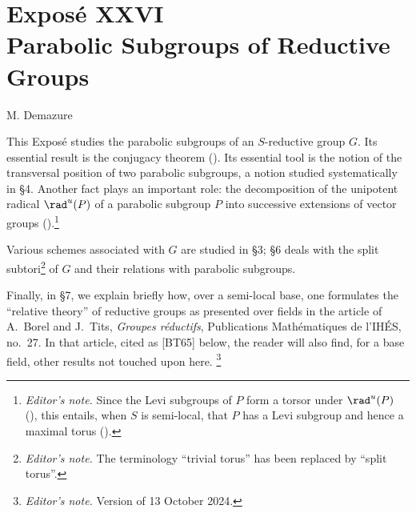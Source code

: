 
\chapter*{Exposé XXVI\\Parabolic Subgroups of Reductive Groups}
\begin{center}
\large M. Demazure
\end{center}

\medskip

This Exposé studies the parabolic subgroups of an \(S\)-reductive group \(G\).
Its essential result is the conjugacy theorem ().  Its essential tool is
the notion of the transversal position of two parabolic subgroups, a notion
studied systematically in §4.  Another fact plays an important role: the
decomposition of the unipotent radical \(\rad^{u}(P)\) of a parabolic subgroup
\(P\) into successive extensions of vector groups
().\footnote{\emph{Editor's note.} Since the Levi subgroups of \(P\) form a
torsor under \(\rad^{u}(P)\) (), this entails, when \(S\) is semi-local,
that \(P\) has a Levi subgroup and hence a maximal torus ().}

Various schemes associated with \(G\) are studied in §3; §6 deals with the
split subtori\footnote{\emph{Editor's note.} The terminology ``trivial
torus'' has been replaced by ``split torus''.} of \(G\) and their relations
with parabolic subgroups.

Finally, in §7, we explain briefly how, over a semi-local base, one formulates
the ``relative theory'' of reductive groups as presented over fields in the
article of A.~Borel and J.~Tits, \emph{Groupes réductifs}, Publications
Mathématiques de l'IHÉS, no.~27.  In that article, cited as [BT65] below, the
reader will also find, for a base field, other results not touched upon here.
\footnote{\emph{Editor's note.} Version of 13 October 2024.}



